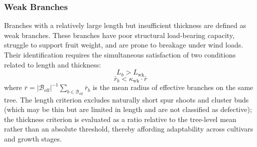 \documentclass[12pt,a4paper,fontset=fandol]{ctexart}
\newcommand{\rb}{\bar{r}_b}
\begin{document}
\subsubsection{Weak Branches}

Branches with a relatively large length but insufficient thickness are defined as weak branches. These branches have poor structural load-bearing capacity, struggle to support fruit weight, and are prone to breakage under wind loads. Their identification requires the simultaneous satisfaction of two conditions related to length and thickness:
\begin{equation}\label{eq:weak_length}
  L_b > L_{\text{wk}}
\end{equation}
\begin{equation}\label{eq:weak_radius}
  \rb < \kappa_{\text{wk}} \cdot \bar{r}
\end{equation}
where $\bar{r} = |\mathcal{B}_{\text{eff}}|^{-1}\sum_{b \in \mathcal{B}_{\text{eff}}} \rb$ is the mean radius of effective branches on the same tree.
The length criterion excludes naturally short spur shoots and cluster buds (which may be thin but are limited in length and are not classified as defective);
the thickness criterion is evaluated as a ratio relative to the tree-level mean rather than an absolute threshold,
thereby affording adaptability across cultivars and growth stages.
\end{document}

